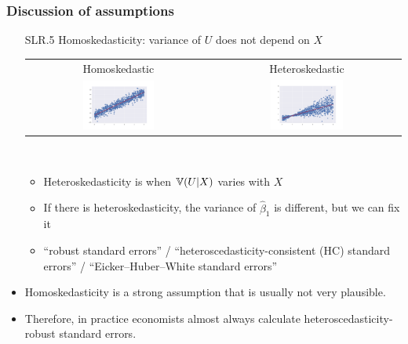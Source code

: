 \begin{frame}[allowframebreaks]
  \frametitle{Discussion of assumptions}
  \begin{itemize}
  \item[SLR.5] Homoskedasticity: variance of $U$ does not
    depend on $X$ \\
    \begin{tabular}{cc} 
      \alert{Homoskedastic} & \alert{Heteroskedastic} \\ 
      \includegraphics[width=0.4\textwidth]{lreg_homoskedastic} &
      \includegraphics[width=0.4\textwidth]{lreg_heteroskedastic} 
    \end{tabular} \\
    \begin{itemize}
    \item \alert{Heteroskedasticity} is when $\mathbb{V}(U|X)$ varies
      with $X$
    \item If there is heteroskedasticity, the variance of
      $\hat{\beta}_1$ is different, but we can fix it 
    \item ``robust standard errors'' / ``heteroscedasticity-consistent
      (HC) standard errors'' / ``Eicker–Huber–White standard errors''
    \end{itemize}
\item Homoskedasticity is a strong assumption that is usually not very
plausible. 
\item Therefore, in practice economists almost always calculate
heteroscedasticity-robust standard errors. 
\end{itemize}
\end{frame}


